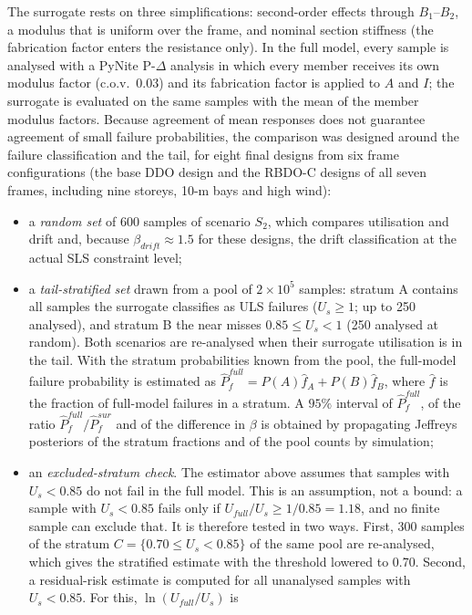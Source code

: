 The surrogate rests on three simplifications: second-order effects through $B_1$--$B_2$, a
modulus that is uniform over the frame, and nominal section stiffness (the fabrication factor
enters the resistance only). In the full model, every sample is analysed with a PyNite
P-$\Delta$ analysis in which every member receives its own modulus factor (c.o.v.\ 0.03) and its
fabrication factor is applied to $A$ and $I$; the surrogate is evaluated on the same samples with
the mean of the member modulus factors. Because agreement of mean responses does not guarantee
agreement of small failure probabilities, the comparison was designed around the failure
classification and the tail, for eight final designs from six frame configurations (the base
DDO design and the RBDO-C designs of all seven frames, including nine storeys, 10-m bays and high
wind):
\begin{itemize}
\item a \emph{random set} of 600 samples of scenario $S_2$, which compares utilisation and drift and,
because $\beta_{drift}\approx1.5$ for these designs, the drift classification at the actual SLS
constraint level;
\item a \emph{tail-stratified set} drawn from a pool of $2\times10^5$ samples: stratum A contains
all samples the surrogate classifies as ULS failures ($U_s\ge1$; up to 250 analysed), and stratum B
the near misses $0.85\le U_s<1$ (250 analysed at random). Both scenarios are re-analysed when their
surrogate utilisation is in the tail. With the stratum probabilities known from the pool, the
full-model failure probability is estimated as $\hat P_f^{full} = P(A)\hat f_A + P(B)\hat f_B$,
where $\hat f$ is the fraction of full-model failures in a stratum. A $95\%$ interval of
$\hat P_f^{full}$, of the ratio $\hat P_f^{full}/\hat P_f^{sur}$ and of the difference in $\beta$ is
obtained by propagating Jeffreys posteriors of the stratum fractions and of the pool counts by simulation;
\item an \emph{excluded-stratum check}. The estimator above assumes that samples with $U_s<0.85$
do not fail in the full model. This is an assumption, not a bound: a sample with $U_s<0.85$ fails
only if $U_{full}/U_s\ge1/0.85=1.18$, and no finite sample can exclude that. It is therefore tested in
two ways. First, 300 samples of the stratum $C=\{0.70\le U_s<0.85\}$ of the same pool are re-analysed,
which gives the stratified estimate with the threshold lowered to 0.70. Second, a residual-risk
estimate is computed for all unanalysed samples with $U_s<0.85$. For this, $\ln(U_{full}/U_s)$ is

\end{itemize}
